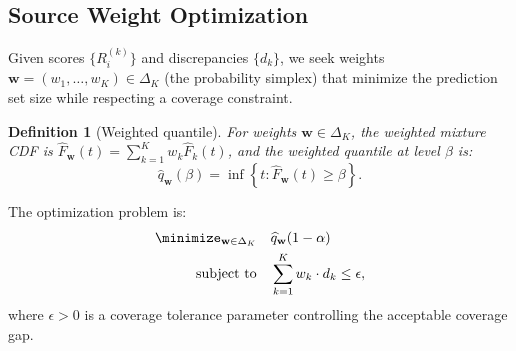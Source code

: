 \documentclass{article}
\newtheorem{definition}{Definition}
\newcommand{\Fhat}{\widehat{F}}
\newcommand{\qhat}{\widehat{q}}
\newcommand{\simplex}{\Delta_{K}}
\begin{document}
\subsection{Source Weight Optimization}
\label{sec:optimization}

Given scores $\{R_i^{(k)}\}$ and discrepancies $\{d_k\}$, we seek weights $\mathbf{w} = (w_1, \ldots, w_K) \in \simplex$ (the probability simplex) that minimize the prediction set size while respecting a coverage constraint.

\begin{definition}[Weighted quantile]
\label{def:weighted_quantile}
For weights $\mathbf{w} \in \simplex$, the weighted mixture CDF is $\Fhat_{\mathbf{w}}(t) = \sum_{k=1}^K w_k \Fhat_k(t)$, and the weighted quantile at level $\beta$ is:
\begin{equation}
\label{eq:weighted_quantile}
\qhat_{\mathbf{w}}(\beta) = \inf\left\{t : \Fhat_{\mathbf{w}}(t) \geq \beta\right\}.
\end{equation}
\end{definition}

The optimization problem is:
\begin{equation}
\label{eq:optimization}
\begin{aligned}
\minimize_{\mathbf{w} \in \simplex} \quad & \qhat_{\mathbf{w}}(1 - \alpha) \\
\text{subject to} \quad & \sum_{k=1}^K w_k \cdot d_k \leq \epsilon,
\end{aligned}
\end{equation}
where $\epsilon > 0$ is a coverage tolerance parameter controlling the acceptable coverage gap.
\end{document}
